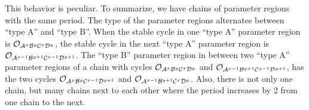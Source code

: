 This behavior is peculiar.
To summarize, we have chains of parameter regions with the same period.
The type of the parameter regions alternates between ``type A'' and ``type B''.
When the stable cycle in one ``type A'' parameter region is $\mathcal{O}_{\mathcal{A}^x\mathcal{B}^y\mathcal{C}^x\mathcal{D}^y}$, the stable cycle in the next ``type A'' parameter region is $\mathcal{O}_{\mathcal{A}^{x-1}\mathcal{B}^{y+1}\mathcal{C}^{x-1}\mathcal{D}^{y+1}}$.
The ``type B'' parameter region in between two ``type A'' parameter regions of a chain with cycles $\mathcal{O}_{\mathcal{A}^x\mathcal{B}^y\mathcal{C}^x\mathcal{D}^y}$ and $\mathcal{O}_{\mathcal{A}^{x-1}\mathcal{B}^{y+1}\mathcal{C}^{x-1}\mathcal{D}^{y+1}}$, has the two cycles $\mathcal{O}_{\mathcal{A}^x\mathcal{B}^y\mathcal{C}^{x-1}\mathcal{D}^{y+1}}$ and $\mathcal{O}_{\mathcal{A}^{x-1}\mathcal{B}^{y+1}\mathcal{C}^x\mathcal{D}^y}$.
Also, there is not only one chain, but many chains next to each other where the period increases by 2 from one chain to the next.
